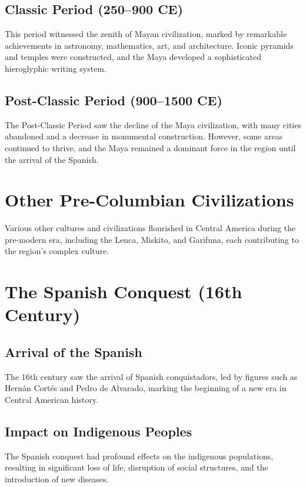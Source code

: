 \documentclass[a4paper,12pt]{book}
\begin{document}
\subsection{Classic Period (250–900 CE)}
\label{subsec:classic-maya}
This period witnessed the zenith of Mayan civilization, marked by remarkable achievements in astronomy, mathematics, art, and architecture. Iconic pyramids and temples were constructed, and the Maya developed a sophisticated hieroglyphic writing system.

\subsection{Post-Classic Period (900–1500 CE)}
\label{subsec:post-classic-maya}
The Post-Classic Period saw the decline of the Maya civilization, with many cities abandoned and a decrease in monumental construction. However, some areas continued to thrive, and the Maya remained a dominant force in the region until the arrival of the Spanish.

\section{Other Pre-Columbian Civilizations}
\label{sec:other-pre-columbian-civilizations}
Various other cultures and civilizations flourished in Central America during the pre-modern era, including the Lenca, Miskito, and Garifuna, each contributing to the region's complex culture.

\section{The Spanish Conquest (16th Century)}
\label{sec:spanish-conquest}
\subsection{Arrival of the Spanish}
\label{subsec:arrival-spanish}
The 16th century saw the arrival of Spanish conquistadors, led by figures such as Hernán Cortés and Pedro de Alvarado, marking the beginning of a new era in Central American history.

\subsection{Impact on Indigenous Peoples}
\label{subsec:impact-indigenous-peoples}
The Spanish conquest had profound effects on the indigenous populations, resulting in significant loss of life, disruption of social structures, and the introduction of new diseases.
\end{document}
